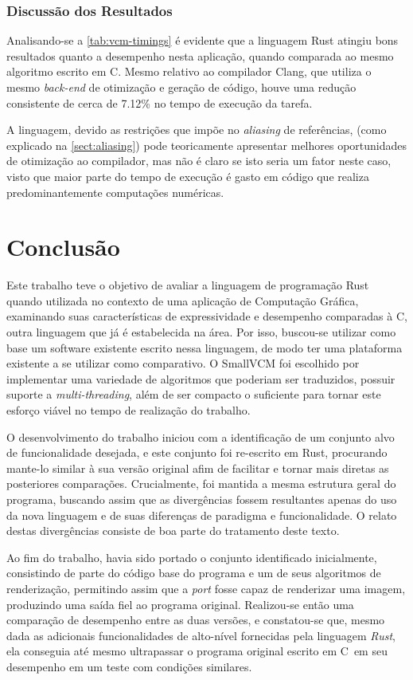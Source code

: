 \documentclass[tg]{mdtufsm}
\def\Cpp{{C\nolinebreak[4]\raisebox{.20ex}{\small\bf++}}}
\begin{document}
\subsection{Discussão dos Resultados}

Analisando-se a \autoref{tab:vcm-timings} é evidente que a linguagem Rust atingiu bons resultados quanto a desempenho nesta aplicação, quando comparada ao mesmo algoritmo escrito em \Cpp. Mesmo relativo ao compilador Clang, que utiliza o mesmo \emph{back-end} de otimização e geração de código, houve uma redução consistente de cerca de 7.12\% no tempo de execução da tarefa.

A linguagem, devido as restrições que impõe no \emph{aliasing} de referências, (como explicado na \autoref{sect:aliasing}) pode teoricamente apresentar melhores oportunidades de otimização ao compilador, mas não é claro se isto seria um fator neste caso, visto que maior parte do tempo de execução é gasto em código que realiza  predominantemente computações numéricas.

\chapter{Conclusão}

Este trabalho teve o objetivo de avaliar a linguagem de programação Rust quando utilizada no contexto de uma aplicação de Computação Gráfica, examinando suas características de expressividade e desempenho comparadas à \Cpp, outra linguagem que já é estabelecida na área. Por isso, buscou-se utilizar como base um software existente escrito nessa linguagem, de modo ter uma plataforma existente a se utilizar como comparativo. O SmallVCM foi escolhido por implementar uma variedade de algoritmos que poderiam ser traduzidos, possuir suporte a \emph{multi-threading}, além de ser compacto o suficiente para tornar este esforço viável no tempo de realização do trabalho.

O desenvolvimento do trabalho iniciou com a identificação de um conjunto alvo de funcionalidade desejada, e este conjunto foi re-escrito em Rust, procurando mante-lo similar à sua versão original afim de facilitar e tornar mais diretas as posteriores comparações. Crucialmente, foi mantida a mesma estrutura geral do programa, buscando assim que as divergências fossem resultantes apenas do uso da nova linguagem e de suas diferenças de paradigma e funcionalidade. O relato destas divergências consiste de boa parte do tratamento deste texto.

Ao fim do trabalho, havia sido portado o conjunto identificado inicialmente, consistindo de parte do código base do programa e um de seus algoritmos de renderização, permitindo assim que a \emph{port} fosse capaz de renderizar uma imagem, produzindo uma saída fiel ao programa original. Realizou-se então uma comparação de desempenho entre as duas versões, e constatou-se que, mesmo dada as adicionais funcionalidades de alto-nível fornecidas pela linguagem \emph{Rust}, ela conseguia até mesmo ultrapassar o programa original escrito em \Cpp\ em seu desempenho em um teste com condições similares.
\end{document}
